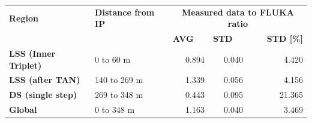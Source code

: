 \documentclass[encoding=utf8,british]{tumphthesis}
\begin{document}
\begin{table}[H]
    \begin{subtable}{1.0\textwidth}
    \centering
    \label{tab:agreement-levels-BLMs-2017}
\begin{tabular}{|l|l|rrr|}
\hline
\rowcolor[HTML]{CFE2F3} 
\textbf{Region}              & \textbf{Distance from IP} & \multicolumn{3}{c|}{\cellcolor[HTML]{CFE2F3}\textbf{Measured data to FLUKA ratio}}                                             \\
                             &               & \multicolumn{1}{l}{\textbf{AVG}} & \multicolumn{1}{l}{\textbf{STD}} & \multicolumn{1}{r|}{\textbf{STD {[}\%{]}}} \\ \hline
\rowcolor[HTML]{CFE2F3} 
\textbf{LSS (Inner Triplet)} & 0 to 60 m     & 0.894                              & 0.040                             & 4.420                                      \\
\textbf{LSS (after TAN)}     & 140 to 269 m  & 1.339                              & 0.056                             & 4.156                                      \\
\rowcolor[HTML]{CFE2F3} 
\textbf{DS (single step)}    & 269 to 348 m  & 0.443                              & 0.095                             & 21.365                                     \\ \hline
\textbf{Global}              & 0 to 348 m    & 1.163                              & 0.040                             & 3.469                                      \\ \hline
\end{tabular}
\end{subtable}

    \bigskip

    \hfill

    \begin{subtable}{1.0\textwidth}
    \centering
    \label{tab:agreement-levels-BLMs-2018}


\end{subtable}
\end{table}
\end{document}
